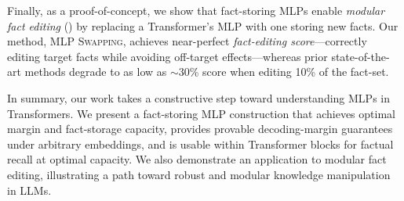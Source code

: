 Finally, as a proof-of-concept, we show that fact-storing MLPs enable \emph{modular fact editing} () by replacing a Transformer's MLP with one storing new facts.
Our method, \textsc{MLP Swapping}, achieves near-perfect \emph{fact-editing score}---correctly editing target facts while avoiding off-target effects---whereas prior state-of-the-art methods degrade to as low as $\sim30$\% score when editing 10\% of the fact-set.

In summary, our work takes a constructive step toward understanding MLPs in Transformers. We present a fact-storing MLP construction that achieves optimal margin and fact-storage capacity, provides provable decoding-margin guarantees under arbitrary embeddings, and is usable within Transformer blocks for factual recall at optimal capacity. We also demonstrate an application to modular fact editing, illustrating a path toward robust and modular knowledge manipulation in LLMs.
